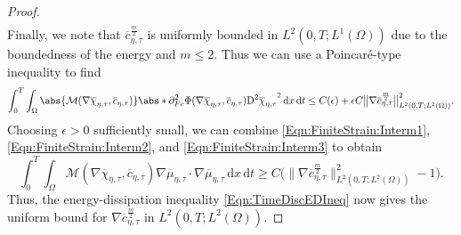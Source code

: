 \documentclass[a4paper,12pt]{article}
\newcommand{\calM}{\mathcal{M}}
\newcommand{\pl}{\partial}
\newcommand{\dx}{\mathrm{\,d}x}
\newcommand{\dt}{\mathrm{\,d}t}
\newcommand{\chibar}{\overline{\chi}}
\newcommand{\mubar}{\overline{\mu}}
\newcommand{\cbar}{\overline{c}}
\newcommand{\rmD}{\mathrm{D}}
\theoremstyle{plain}
\theoremstyle{definition}
\numberwithin{equation}{section}
\begin{document}
\begin{proof}
\begin{align*}
    \end{align*}
    Finally, we note that $\cbar_{\eta,\tau}^{\frac{m}{2}} $ is uniformly bounded in 
$L^2(0,T;L^1(\Omega))$ due to the boundedness of the energy and 
$m \leq 2$. 
Thus we can use a Poincar\'e-type inequality to find
    \begin{equation}
    \label{Eqn:FiniteStrain:Interm3}
    	\int_0^T\int_\Omega \abs{\calM(\nabla\chibar_{\eta,\tau},\cbar_{\eta,\tau})}\abs*{\pl^2_{Fc}\Phi(\nabla\chibar_{\eta,\tau},\cbar_{\eta,\tau})\rmD^2\chibar_{\eta,\tau}}^2\dx\dt \leq C(\epsilon) + \epsilon C\big\|{\nabla \cbar_{\eta,\tau}^{\frac{m}{2}}}\big\|^2_{L^2(0,T;L^2(\Omega))}.
    \end{equation}
	Choosing $\epsilon>0$ sufficiently small, we can combine \eqref{Eqn:FiniteStrain:Interm1}, \eqref{Eqn:FiniteStrain:Interm2}, and \eqref{Eqn:FiniteStrain:Interm3} to obtain    
	\begin{equation*}
	\int_0^T\int_\Omega \calM(\nabla\chibar_{\eta,\tau},\cbar_{\eta,\tau})\nabla\mubar_{\eta,\tau}\cdot\nabla\mubar_{\eta,\tau} \dx\dt \geq C\big(\big\|{\nabla \cbar_{\eta,\tau}^{\frac{m}{2}}}\big\|_{L^2(0,T;L^2(\Omega))}^2 - 1\big).
    \end{equation*}    
    Thus, the energy-dissipation inequality \eqref{Eqn:TimeDiscEDIneq} now gives the uniform bound for $\nabla \cbar_{\eta,\tau}^\frac{m}{2}$ in $L^2(0,T;L^2(\Omega))$.
    \medskip    



















\end{proof}
\end{document}
